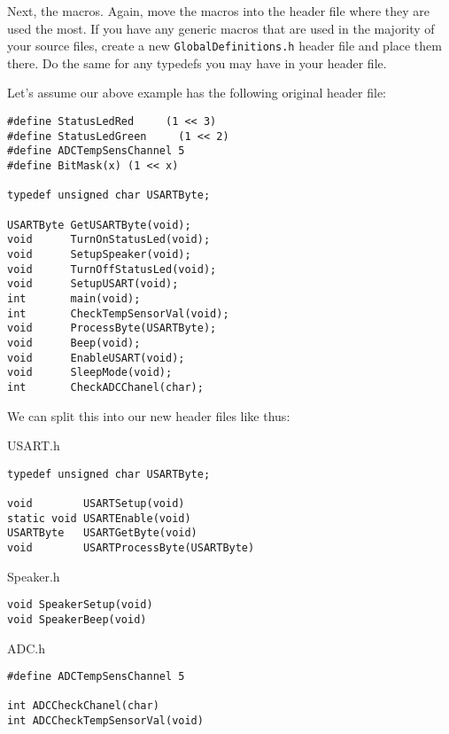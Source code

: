 \documentclass[a4paper,oneside]{book}
\begin{document}
Next, the macros. Again, move the macros into the header file where they are used the most. If you have any generic macros that are used in the majority of your source files, create a new \texttt{GlobalDefinitions.h} header file and place them there. Do the same for any typedefs you may have in your header file.

Let's assume our above example has the following original header file:

\begin{center}
\begin{lstlisting}
#define StatusLedRed     (1 << 3)
#define StatusLedGreen     (1 << 2)
#define ADCTempSensChannel 5
#define BitMask(x) (1 << x)

typedef unsigned char USARTByte;

USARTByte GetUSARTByte(void);
void      TurnOnStatusLed(void);
void      SetupSpeaker(void);
void      TurnOffStatusLed(void);
void      SetupUSART(void);
int       main(void);
int       CheckTempSensorVal(void);
void      ProcessByte(USARTByte);
void      Beep(void);
void      EnableUSART(void);
void      SleepMode(void);
int       CheckADCChanel(char);
\end{lstlisting}
\end{center}

We can split this into our new header files like thus:

USART.h
\begin{center}
\begin{lstlisting}
typedef unsigned char USARTByte;

void        USARTSetup(void)
static void USARTEnable(void)
USARTByte   USARTGetByte(void)
void        USARTProcessByte(USARTByte)
\end{lstlisting}
\end{center}

Speaker.h
\begin{center}
\begin{lstlisting}
void SpeakerSetup(void)
void SpeakerBeep(void)
\end{lstlisting}
\end{center}

ADC.h
\begin{center}
\begin{lstlisting}
#define ADCTempSensChannel 5

int ADCCheckChanel(char)
int ADCCheckTempSensorVal(void)
\end{lstlisting}
\end{center}
\end{document}

